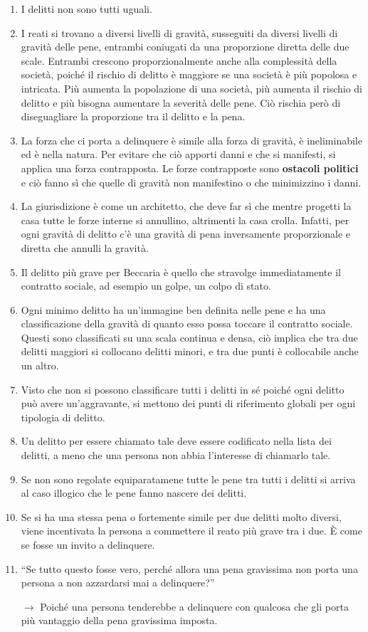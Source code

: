 \documentclass{article}
\begin{document}
\begin{enumerate}
    \item I delitti non sono tutti uguali.
    \item I reati si trovano a diversi livelli di gravità, susseguiti da diversi livelli di
    gravità delle pene, entrambi coniugati da una proporzione diretta delle due scale.
    Entrambi crescono proporzionalmente anche alla complessità della società, 
    poiché il rischio di delitto è maggiore se una società è più popolosa e intricata.
    Più aumenta la popolazione di una società, più aumenta il rischio di delitto e più 
    bisogna aumentare la severità delle pene. Ciò rischia però di diseguagliare la 
    proporzione tra il delitto e la pena.
    \item La forza che ci porta a delinquere è simile alla forza di gravità, è ineliminabile ed 
    è nella natura.
    Per evitare che ciò apporti danni e che si manifesti, si applica una forza 
    contrapposta.
    Le forze contrapposte sono \textbf{ostacoli politici} e ciò fanno sì che quelle di gravità 
    non manifestino o che minimizzino i danni.
    \item La giurisdizione è come un architetto, che deve far sì che mentre progetti la casa 
    tutte le forze interne si annullino, altrimenti la casa crolla. Infatti, per ogni 
    gravità di delitto c'è una gravità di pena inversamente proporzionale e diretta 
    che annulli la gravità.
    \item Il delitto più grave per Beccaria è quello che stravolge immediatamente il 
    contratto sociale, ad esempio un golpe, un colpo di stato.
    \item Ogni minimo delitto ha un'immagine ben definita nelle pene e ha una 
    classificazione della gravità di quanto esso possa toccare il contratto sociale.
    Questi sono classificati su una scala continua e densa, ciò implica che tra due delitti 
    maggiori si collocano delitti minori, e tra due punti è collocabile anche un altro.
    \item Visto che non si possono classificare tutti i delitti in sé poiché ogni delitto può 
    avere un'aggravante, si mettono dei punti di riferimento globali per ogni tipologia di
    delitto.
    \item Un delitto per essere chiamato tale deve essere codificato nella lista dei delitti, a 
    meno che una persona non abbia l'interesse di chiamarlo tale.
    \item Se non sono regolate equiparatamene tutte le pene tra tutti i delitti si arriva al 
    caso illogico che le pene fanno nascere dei delitti.
    \item Se si ha una stessa pena o fortemente simile per due delitti molto diversi, viene 
    incentivata la persona a commettere il reato più grave tra i due. È come se fosse 
    un invito a delinquere.
    \item ``Se tutto questo fosse vero, perché allora una pena gravissima non porta una 
    persona a non azzardarsi mai a delinquere?''
    \item[$\rightarrow$] Poiché una persona tenderebbe a delinquere con qualcosa che gli porta più 
    vantaggio della pena gravissima imposta.
\end{enumerate}
\end{document}

